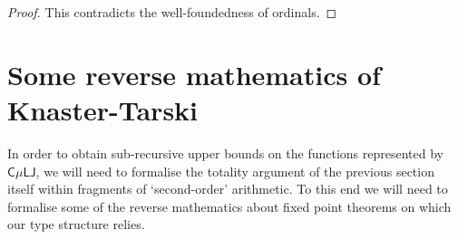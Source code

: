 \documentclass[10pt,a4paper]{amsart}
\theoremstyle{plain}
\theoremstyle{definition}
\newcommand{\oldtodo}[1]{\todo{#1}} %
\renewcommand{\todo}[1]{}
\theoremstyle{plain}
\theoremstyle{definition} %
\newcommand{\sem}[1]{\llbracket {#1} \rrbracket}
\newcommand{\seqar}{\Rightarrow}
\newcommand{\LJ}{\mathsf{LJ}}
\newcommand{\muLJ}{\mu\LJ}
\newcommand{\circular}{\mathsf C}
\newcommand{\cmuLJ}{\circular\muLJ}
\newcommand{\hr}[1]{|#1|}
\begin{document}
\begin{proof}
% 
% 
    
\noindent
This contradicts the well-foundedness of ordinals.
\end{proof}

\section{Some reverse mathematics of Knaster-Tarski}
\label{sec:rev-math-kt}
In order to obtain sub-recursive upper bounds on the functions represented by $\cmuLJ$, we will need to formalise the totality argument of the previous section itself within fragments of `second-order' arithmetic.
% 
To this end we will need to formalise some of the reverse mathematics about fixed point theorems on which our type structure relies.
\end{document}
